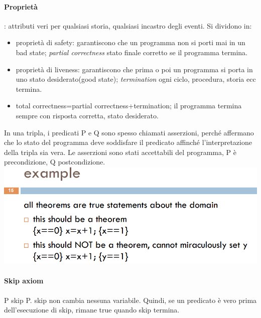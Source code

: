 \documentclass[10pt,a4paper]{article}
\begin{document}
\paragraph{Proprietà}: attributi veri per qualsiasi storia, qualsiasi incastro degli eventi.
Si dividono in:
\begin{itemize}
\item proprietà di safety: garantiscono che un programma non si porti mai in un bad state; \textit{partial correctness} stato finale corretto se il programma termina.
\item proprietà di liveness: garantiscono che prima o poi un programma si porta in uno stato desiderato(good state); \textit{termination} ogni ciclo, procedura, storia ecc termina.
\item total correctness=partial correctness+termination; il programma termina sempre con risposta corretta, stato desiderato.
\end{itemize} 

In una tripla, i predicati P e Q sono spesso chiamati asserzioni, perché affermano che lo stato del programma deve soddisfare il predicato affinché l'interpretazione della tripla sia vera.
Le asserzioni sono stati accettabili del programma, P è precondizione, Q postcondizione.\\
\includegraphics[scale=0.45]{img/theorem.png} \\

\paragraph{Skip axiom} {P} skip {P}.
skip non cambia nessuna variabile. Quindi, se un predicato è vero prima dell'esecuzione di skip, rimane
true quando skip termina.
\end{document}
